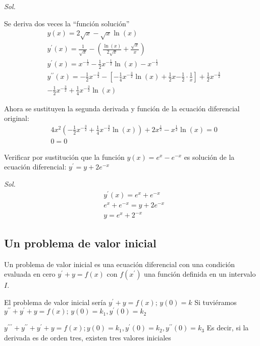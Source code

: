 \textit{ Sol. }

Se deriva dos veces la ``función solución''
\begin{align*}
    &y(x)=2\sqrt{x}-\sqrt{x}\ln{(x)}\\
    &y^{\prime}(x)=\frac{1}{\sqrt{x}}-\left(\frac{\ln(x)}{2\sqrt{x}}+\frac{\sqrt{x}}{x}\right)\\
    &y^{\prime}(x)=x^{-\frac{1}{2}}-\frac{1}{2}x^{-\frac{1}{2}}\ln{(x)}-x^{-\frac{1}{2}}\\
    &y^{\prime\prime}(x)=-\frac{1}{2}x^{-\frac{3}{2}}-\left[-\frac{1}{4}x^{-\frac{3}{2}}\ln{(x)}+\frac{1}{2}x{-\frac{1}{2}}\cdot\frac{1}{x}\right]+\frac{1}{2}x^{-\frac{3}{2}}\\
    &-\frac{1}{2}x^{-\frac{3}{2}}+\frac{1}{4}x^{-\frac{3}{2}}\ln{(x)}
\end{align*}

Ahora se sustituyen la segunda derivada y función de la ecuación diferencial original: 
\begin{align*}
    &4x^2\left(-\frac{1}{2}x^{-\frac{3}{2}}+\frac{1}{4}x^{-\frac{3}{2}}\ln{(x)}\right)+2x^{\frac{1}{2}}-x^{\frac{1}{2}}\ln{(x)}=0\\
    &0=0
\end{align*}

\begin{example}
    Verificar por sustitución que la función 
    $y(x)=e^x-e^{-x}$ es solución de la ecuación diferencial: $y^{\prime}=y+2e^{-x}$
\end{example}

\textit{ Sol. }
\begin{align*}
    &y^{\prime}(x)=e^x+e^{-x}\\
    &e^x+e^{-x}=y+2e^{-x}\\
    &y=e^x+2^{-x}
\end{align*}

\subsection{Un problema de valor inicial}

Un problema de valor inicial es una ecuación diferencial con una condición evaluada en cero
$y^{\prime}+y=f(x)$ con $f(x^{\prime})$ una función definida en un intervalo $I$.

El problema de valor inicial sería $y^{\prime}+y=f(x);\, y(0)=k$
Si tuviéramos $y^{\prime\prime}+y^{\prime}+y=f(x);\, y(0)=k_1, y^{\prime}(0)=k_2$

$y^{\prime\prime\prime}+y^{\prime\prime}+y^{\prime}+y=f(x);y(0)=k_1, y^{\prime}(0)=k_2, y^{\prime\prime}(0)=k_3$
Es decir, si la derivada es de orden tres, existen tres valores iniciales

